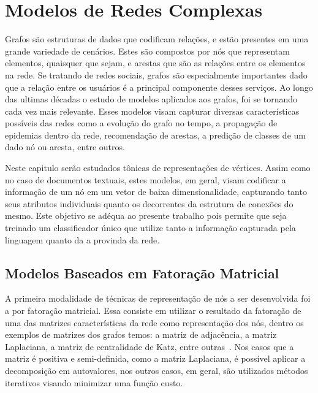 \chapter{Modelos de Redes Complexas}
\label{chapter:networks}

Grafos são estruturas de dados que codificam relações, e estão presentes em uma
grande variedade de cenários.
Estes são compostos por nós que representam elementos, quaisquer que sejam, e
arestas que são as relações entre os elementos na rede.
Se tratando de redes sociais, grafos são especialmente importantes dado que
a relação entre os usuários é a principal componente desses serviços.
Ao longo das ultimas décadas o estudo de modelos aplicados aos grafos, foi se
tornando cada vez mais relevante.
Esses modelos visam capturar diversas características possíveis das redes como a
evolução do grafo no tempo, a propagação de epidemias dentro da rede,
recomendação de arestas, a predição de classes de um dado nó ou aresta, entre outros.

Neste capitulo serão estudados tônicas de representações de vértices.
Assim como no caso de documentos textuais, estes modelos, em geral, visam
codificar a informação de um nó em um vetor de baixa dimensionalidade,
capturando tanto seus atributos individuais quanto os decorrentes da estrutura
de conexões do mesmo.
Este objetivo se adéqua ao presente trabalho pois permite que seja treinado um
classificador único que utilize tanto a informação capturada pela linguagem quanto
da a provinda da rede.




\section{Modelos Baseados em Fatoração Matricial}

A primeira modalidade de técnicas de representação de nós a ser desenvolvida foi
a por fatoração matricial.
Essa consiste em utilizar o resultado da fatoração de uma das matrizes
características da rede como representação dos nós, dentro os exemplos de
matrizes dos grafos temos: a matriz de adjacência, a matriz Laplaciana, a matriz
de centralidade de Katz, entre outras~\cite{goyal18}.
Nos casos que a matriz é positiva e semi-definida, como a matriz Laplaciana, é
possível aplicar a decomposição em autovalores, nos outros casos, em geral, são
utilizados métodos iterativos visando minimizar uma função custo.

